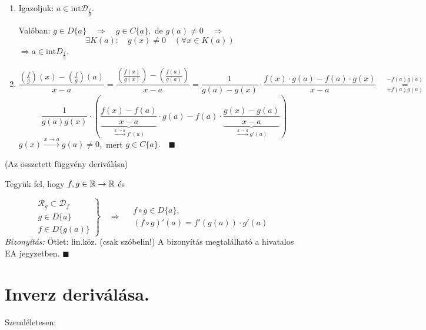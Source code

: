 \documentclass[a4paper,11.5pt]{article}
\begin{document}
\begin{theorem}
		\begin{enumerate}
			\item Igazoljuk: \quad $a\in\text{int}\mathcal{D}_{\frac{f}{g}}$.
			
			Valóban: $g\in D\{a\}\quad \Rightarrow\quad g\in C\{a\},$ de $g(a)\not=0\quad \Rightarrow$
			\[ \exists K(a):\quad g(x)\not=0\quad (\forall x\in K(a)) \]
			$\Rightarrow a\in \text{int}D_{\frac{f}{g}}$.
			\item 
			
			\[\frac{\left(\frac{f}{g}\right)(x)-\left(\frac{f}{g}\right)(a)}{x-a}=\frac{\left(\frac{f(x)}{g(x)}\right)-\left(\frac{f(a)}{g(a)}\right)}{x-a}=\frac{1}{g(a)-g(x)}\cdot\frac{f(x)\cdot g(a)-f(a)\cdot g(x)}{x-a}\quad \overset{-f(a)g(a)}{\underset{+f(a)g(a)}{=}}\]\[\quad \frac{1}{g(a)g(x)}\cdot\left(\underbrace{\frac{f(x)-f(a)}{x-a}}_{\overset{x\to a}{\longrightarrow} f'(a)}\cdot g(a)-f(a)\cdot\underbrace{\frac{g(x)-g(a)}{x-a}}_{\overset{x\to a}{\longrightarrow}g'(a)}\right) \]
			$g(x)\overset{x\to a}{\longrightarrow }g(a)\not=0,$ mert $g\in C\{a\}.\quad \blacksquare$
		\end{enumerate}
	\end{theorem}
	\begin{theorem}
		(Az összetett függvény deriválása)
		
		Tegyük fel, hogy $f,g\in\mathbb{R}\to\mathbb{R}$ és
		
		\[\left.\begin{gathered}
		\mathcal{R}_g\subset\mathcal{D}_f\\
		g\in D\{a\}\\
		f\in D\{g(a) \}
		\end{gathered}\right\}\quad \Rightarrow\quad \begin{gathered}
		f\circ g\in D\{a\},\\
		(f\circ g)'(a)=f'(g(a))\cdot g'(a)
		\end{gathered}\]
		\textit{Bizonyítás:} Ötlet: lin.köz. (csak szóbelin!) A bizonyítás megtalálható a hivatalos EA jegyzetben. $\blacksquare$
	\end{theorem}
	\section{Inverz deriválása.}
	Szemléletesen:
	
\end{document}

